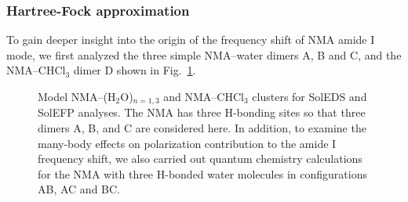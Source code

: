 \documentclass[a4paper,titlepage,twoside,fleqn,12pt]{book}
\begin{document}
\begin{refsection}
\subsubsection{Hartree-Fock approximation}

To gain deeper insight into the origin of the frequency
shift of NMA amide I mode, we first analyzed the three simple
NMA--water dimers A, B and C, and the NMA--CHCl$_3$ dimer D 
shown in Fig.~\ref{f:nma-abcde}. 
%
\begin{figure}[t!]
\centering
\setlength\fboxsep{0.4pt}
\setlength\fboxrule{0.5pt}
\caption{
Model NMA--(H$_2$O)$_{n = 1,3}$ and NMA--CHCl$_3$ clusters 
for SolEDS and SolEFP analyses. The NMA has three H-bonding sites so that three dimers A, B, and C are
considered here. In addition, to examine the many\hyp{}body effects on polarization contribution 
to the amide I frequency shift, we also carried out quantum
chemistry calculations for the NMA with three H-bonded water molecules in configurations
AB, AC and BC.
\label{f:nma-abcde}}
\end{figure}
%


\end{refsection}
\end{document}
